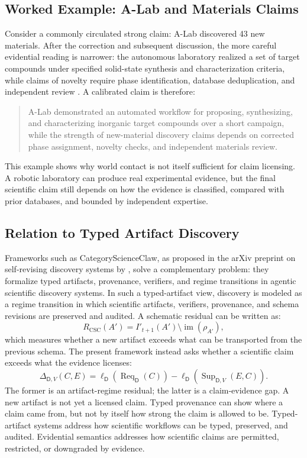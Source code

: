 \documentclass[11pt,a4paper]{article}
\newcommand{\Req}{\operatorname{Req}}
\newcommand{\Sup}{\operatorname{Sup}}
\newcommand{\Dom}{\mathsf{D}}
\begin{document}
\subsection{Worked Example: A-Lab and Materials Claims}

Consider a commonly circulated strong claim: A-Lab discovered 43 new materials. After the correction and subsequent discussion, the more careful evidential reading is narrower: the autonomous laboratory realized a set of target compounds under specified solid-state synthesis and characterization criteria, while claims of novelty require phase identification, database deduplication, and independent review \citep{Szymanski2023ALab,Szymanski2026ALabCorrection,Chawla2026ALabCorrection}. A calibrated claim is therefore:
\begin{quote}
A-Lab demonstrated an automated workflow for proposing, synthesizing, and characterizing inorganic target compounds over a short campaign, while the strength of new-material discovery claims depends on corrected phase assignment, novelty checks, and independent materials review.
\end{quote}
This example shows why world contact is not itself sufficient for claim licensing. A robotic laboratory can produce real experimental evidence, but the final scientific claim still depends on how the evidence is classified, compared with prior databases, and bounded by independent expertise.

\subsection{Relation to Typed Artifact Discovery}

Frameworks such as CategoryScienceClaw, as proposed in the arXiv preprint on self-revising discovery systems by \citet{WangBuehler2026SelfRevising}, solve a complementary problem: they formalize typed artifacts, provenance, verifiers, and regime transitions in agentic scientific discovery systems. In such a typed-artifact view, discovery is modeled as a regime transition in which scientific artifacts, verifiers, provenance, and schema revisions are preserved and audited. A schematic residual can be written as:
\begin{equation}
R_{\mathrm{CSC}}(A')=
I'_{t+1}(A')\setminus \operatorname{im}(\rho_{A'}),
\end{equation}
which measures whether a new artifact exceeds what can be transported from the previous schema. The present framework instead asks whether a scientific claim exceeds what the evidence licenses:
\begin{equation}
\Delta_{\Dom,V}(C,E)=\ell_{\Dom}(\Req_{\Dom}(C))-\ell_{\Dom}(\Sup_{\Dom,V}(E,C)).
\end{equation}
The former is an artifact-regime residual; the latter is a claim-evidence gap. A new artifact is not yet a licensed claim. Typed provenance can show where a claim came from, but not by itself how strong the claim is allowed to be. Typed-artifact systems address how scientific workflows can be typed, preserved, and audited. Evidential semantics addresses how scientific claims are permitted, restricted, or downgraded by evidence.
\end{document}
